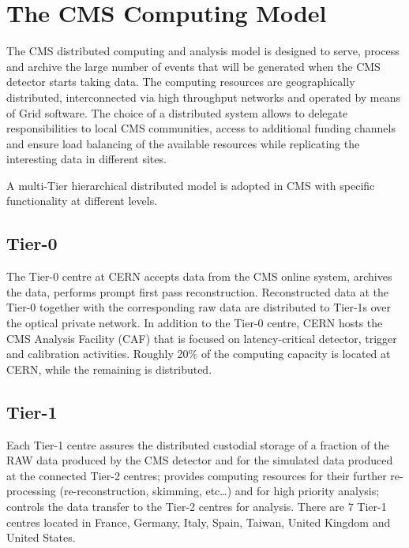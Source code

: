\section{The CMS Computing Model}
\label{sec:2}
The CMS distributed computing and analysis model is designed to serve, process and archive the %
large number of events that will be generated when the CMS detector starts taking data. The computing resources are geographically distributed, interconnected via high throughput networks and operated by means of Grid software. 
The choice of a distributed system allows to delegate responsibilities to local CMS communities, access to additional funding channels and ensure load balancing of the available resources while replicating the interesting data in different sites.


A multi-Tier hierarchical distributed model is adopted in CMS with specific functionality at different levels.
\subsection{Tier-0}
\label{sec:2_1}
The Tier-0 centre at CERN accepts data from the CMS online system, archives the data, performs prompt first pass reconstruction. Reconstructed data at the Tier-0 together with the corresponding raw data are distributed to Tier-1s over the optical private network. In addition to the Tier-0 centre, CERN hosts the CMS Analysis Facility (CAF) that is focused on latency-critical detector, trigger and calibration activities.
Roughly 20\% of the computing capacity is located at CERN, while the remaining is distributed.

\subsection{Tier-1}
\label{sec:2_2}
Each Tier-1 centre assures the distributed custodial storage of a fraction of the RAW data produced by the CMS detector and for the simulated data produced at the connected Tier-2 centres; provides computing resources for their further re-processing (re-reconstruction, skimming, etc…) and for high priority analysis; controls the data transfer to the Tier-2 centres for analysis. There are 7 Tier-1 centres located in France, Germany, Italy, Spain, Taiwan, United Kingdom and United States.

